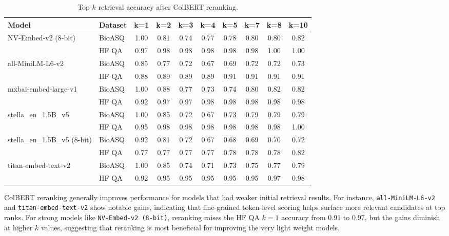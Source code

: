 \documentclass{scrartcl}
\begin{document}
\begin{table}[H]
\centering
\small
\begin{tabular}{l l c c c c c c c c}
\hline
\textbf{Model} & \textbf{Dataset} & \textbf{k=1} & \textbf{k=2} & \textbf{k=3} & \textbf{k=4} & \textbf{k=5} & \textbf{k=7} & \textbf{k=8} & \textbf{k=10} \\
\hline
\multirow{2}{*}{NV-Embed-v2 (8-bit)} 
 & BioASQ & 1.00 & 0.81 & 0.74 & 0.77 & 0.78 & 0.80 & 0.80 & 0.82 \\
 & HF QA  & 0.97 & 0.98 & 0.98 & 0.98 & 0.98 & 0.98 & 1.00 & 1.00 \\
\hline
\multirow{2}{*}{all-MiniLM-L6-v2} 
 & BioASQ & 0.85 & 0.77 & 0.72 & 0.67 & 0.69 & 0.72 & 0.72 & 0.73 \\
 & HF QA  & 0.88 & 0.89 & 0.89 & 0.89 & 0.91 & 0.91 & 0.91 & 0.91 \\
\hline
\multirow{2}{*}{mxbai-embed-large-v1} 
 & BioASQ & 1.00 & 0.88 & 0.77 & 0.73 & 0.74 & 0.80 & 0.82 & 0.82 \\
 & HF QA  & 0.92 & 0.97 & 0.97 & 0.98 & 0.98 & 0.98 & 0.98 & 0.98 \\
\hline
\multirow{2}{*}{stella\_en\_1.5B\_v5} 
 & BioASQ & 1.00 & 0.85 & 0.72 & 0.67 & 0.73 & 0.79 & 0.79 & 0.79 \\
 & HF QA  & 0.95 & 0.98 & 0.98 & 0.98 & 0.98 & 0.98 & 0.98 & 1.00 \\
\hline
\multirow{2}{*}{stella\_en\_1.5B\_v5 (8-bit)} 
 & BioASQ & 0.92 & 0.81 & 0.72 & 0.67 & 0.68 & 0.69 & 0.70 & 0.72 \\
 & HF QA  & 0.77 & 0.77 & 0.77 & 0.77 & 0.78 & 0.78 & 0.78 & 0.82 \\
\hline
\multirow{2}{*}{titan-embed-text-v2} 
 & BioASQ & 1.00 & 0.85 & 0.74 & 0.71 & 0.73 & 0.75 & 0.77 & 0.79 \\
 & HF QA  & 0.92 & 0.95 & 0.95 & 0.95 & 0.95 & 0.95 & 0.97 & 0.98 \\
\hline
\end{tabular}
\caption{Top-$k$ retrieval accuracy after ColBERT reranking.}
\label{table:rerank_results}
\end{table}

ColBERT reranking generally improves performance for models that had weaker initial retrieval results. For instance, \texttt{all-MiniLM-L6-v2} and \texttt{titan-embed-text-v2} show notable gains, indicating that fine-grained token-level scoring helps surface more relevant candidates at top ranks. For strong models like \texttt{NV-Embed-v2 (8-bit)}, reranking raises the HF QA $k=1$ accuracy from 0.91 to 0.97, but the gains diminish at higher $k$ values, suggesting that reranking is most beneficial for improving the very light weight models.
\end{document}
